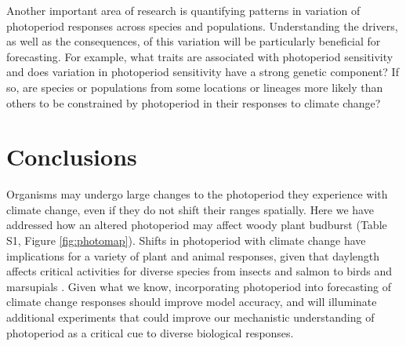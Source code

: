 \documentclass{article}
\begin{document}
\par Another important area of research is quantifying patterns in variation of photoperiod responses across species and populations. Understanding the drivers, as well as the consequences, of this variation will be particularly beneficial for forecasting. For example, what traits are associated with photoperiod sensitivity and does variation in photoperiod sensitivity have a strong genetic component? If so, are species or populations from some locations or lineages more likely than others to be constrained by photoperiod in their responses to climate change?

\section*{Conclusions}
Organisms may undergo large changes to the photoperiod they experience with climate change, even if they do not shift their ranges spatially. Here we have addressed how an altered photoperiod may affect woody plant budburst (Table S1, Figure \ref{fig:photomap}). Shifts in photoperiod with climate change have implications for a variety of plant and animal responses, given that daylength affects critical activities for diverse species from insects \citep{bradshaw2006,linn1996} and salmon \citep{solbakken1994,taranger2003} to birds \citep{dawson2001} and marsupials \citep{mcallan2006,solbakken1994}. Given what we know, incorporating photoperiod into forecasting of climate change responses should improve model accuracy, and will illuminate additional experiments that could improve our mechanistic understanding of photoperiod as a critical cue to diverse biological responses. 
\end{document}
